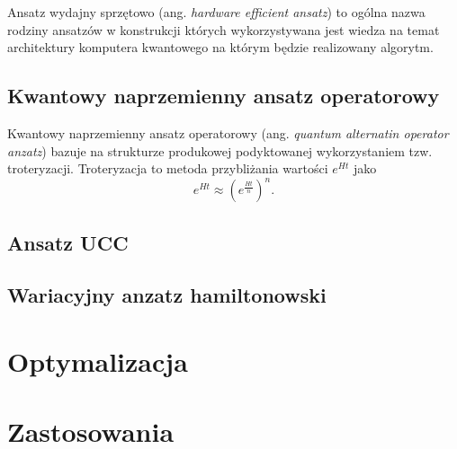 \documentclass[a4paper,11pt]{article}
\newcommand{\ang}[1]{(ang. \emph{#1})}
\begin{document}
Ansatz wydajny sprzętowo \ang{hardware efficient ansatz} to ogólna nazwa rodziny ansatzów w konstrukcji których wykorzystywana jest wiedza na temat architektury komputera kwantowego na którym będzie realizowany algorytm.


\subsection{Kwantowy naprzemienny ansatz operatorowy}

Kwantowy naprzemienny ansatz operatorowy \ang{quantum alternatin operator anzatz} bazuje na strukturze produkowej podyktowanej wykorzystaniem tzw. troteryzacji. Troteryzacja to metoda przybliżania wartości $e^{Ht}$ jako
\begin{equation}
	e^{Ht} \approx \left(e^{\frac{Ht}{n}}\right)^n.
\end{equation}


\subsection{Ansatz UCC}

\subsection{Wariacyjny anzatz hamiltonowski}


\newpage
\hypertarget{optymalizacja}{%
	\section{Optymalizacja}\label{optymalizacja}}



\newpage 
\hypertarget{zastosowania}{%
	\section{Zastosowania}\label{zastosowania}}
\end{document}
